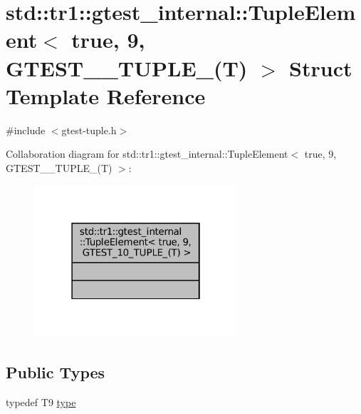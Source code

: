 \hypertarget{structstd_1_1tr1_1_1gtest__internal_1_1TupleElement_3_01true_00_019_00_01GTEST__10__TUPLE___07T_08_01_4}{}\section{std\+:\+:tr1\+:\+:gtest\+\_\+internal\+:\+:Tuple\+Element$<$ true, 9, G\+T\+E\+S\+T\+\_\+\_\+\+T\+U\+P\+L\+E\+\_\+(T) $>$ Struct Template Reference}
\label{structstd_1_1tr1_1_1gtest__internal_1_1TupleElement_3_01true_00_019_00_01GTEST__10__TUPLE___07T_08_01_4}


{\ttfamily \#include $<$gtest-\/tuple.\+h$>$}



Collaboration diagram for std\+:\+:tr1\+:\+:gtest\+\_\+internal\+:\+:Tuple\+Element$<$ true, 9, G\+T\+E\+S\+T\+\_\+\_\+\+T\+U\+P\+L\+E\+\_\+(T) $>$\+:
\nopagebreak
\begin{figure}[H]
\begin{center}
\leavevmode
\includegraphics[width=214pt]{structstd_1_1tr1_1_1gtest__internal_1_1TupleElement_3_01true_00_019_00_01GTEST__10__TUPLE___07T_08_01_4__coll__graph}
\end{center}
\end{figure}
\subsection*{Public Types}
\begin{DoxyCompactItemize}
\item 
typedef T9 \hyperlink{structstd_1_1tr1_1_1gtest__internal_1_1TupleElement_3_01true_00_019_00_01GTEST__10__TUPLE___07T_08_01_4_a4ee11fd8d3873bfa7cce21c1ed2ea770}{type}
\end{DoxyCompactItemize}


